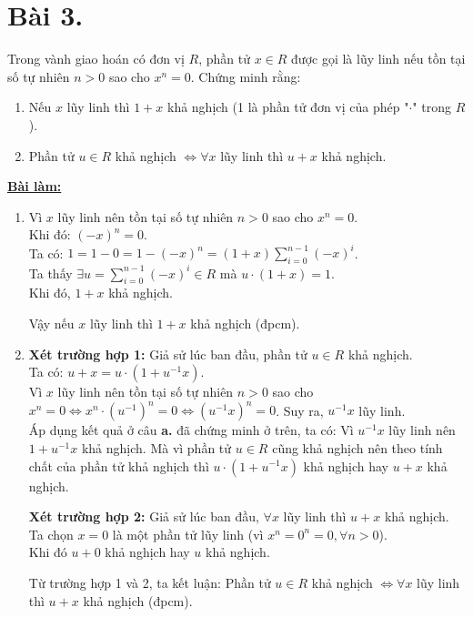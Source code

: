 \section*{Bài 3.}

Trong vành giao hoán có đơn vị $R$, phần tử $x \in R$ được gọi là lũy linh nếu tồn tại số tự nhiên $n > 0$ sao cho $x^n = 0$. Chứng minh rằng:
\begin{enumerate}[label=\alph*.]
    \item Nếu $x$ lũy linh thì $1 + x$ khả nghịch (1 là phần tử đơn vị của phép "$\cdot$" trong $R$).

    \item Phần tử $u \in R$ khả nghịch $\Leftrightarrow \forall x$ lũy linh thì $u + x$ khả nghịch.
\end{enumerate}
	

\centering
\textbf{\underline{Bài làm:}}

\justifying
\begin{enumerate}[label=\alph*.]
    \item Vì $x$ lũy linh nên tồn tại số tự nhiên $n > 0$ sao cho $x^n = 0$.\\
    Khi đó: $(-x)^n = 0$.\\
    Ta có: $\displaystyle 1 = 1 - 0 = 1 - (-x)^n = (1 + x) \sum_{i=0}^{n-1} (-x)^i$.\\
    Ta thấy $\exists u = \displaystyle \sum_{i=0}^{n-1} (-x)^i \in R$ mà $u \cdot (1 + x) = 1$.\\[3pt]
    Khi đó, $1 + x$ khả nghịch.
     
    Vậy nếu $x$ lũy linh thì $1 + x$ khả nghịch (đpcm).

    \item \textbf{Xét trường hợp 1:} Giả sử lúc ban đầu, phần tử $u \in R$ khả nghịch.\\
    Ta có: $u + x = u \cdot (1 + u^{-1} x ).$\\
    Vì $x$ lũy linh nên tồn tại số tự nhiên $n > 0$ sao cho $x^n = 0 \Leftrightarrow x^n \cdot (u^{-1})^n = 0 \Leftrightarrow (u^{-1}x)^n = 0$. Suy ra, $u^{-1}x$ lũy linh.\\
    Áp dụng kết quả ở câu \textbf{a.} đã chứng minh ở trên, ta có: Vì $u^{-1}x$ lũy linh nên $1 + u^{-1}x$ khả nghịch.
    Mà vì phần tử $u \in R$ cũng khả nghịch nên theo tính chất của phần tử khả nghịch thì $u \cdot (1 + u^{-1} x )$ khả nghịch hay $u + x$ khả nghịch.
    
    \textbf{Xét trường hợp 2:} Giả sử lúc ban đầu, $\forall x$ lũy linh thì $u + x$ khả nghịch.\\
    Ta chọn $x = 0$ là một phần tử lũy linh (vì $x^n = 0^n = 0, \forall n > 0$).\\
    Khi đó $u + 0$ khả nghịch hay $u$ khả nghịch.
    
    Từ trường hợp 1 và 2, ta kết luận: Phần tử $u \in R$ khả nghịch $\Leftrightarrow \forall x$ lũy linh thì $u + x$ khả nghịch (đpcm).
\end{enumerate}
	
\clearpage